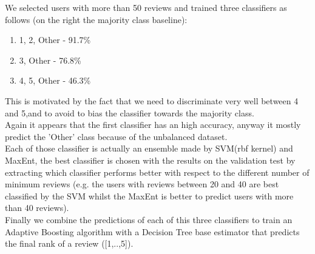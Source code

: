 \documentclass[11pt]{article}
\begin{document}
We selected users with more than 50 reviews and trained three classifiers as follows (on the right the majority class baseline):
\begin{enumerate}
	\item 1, 2, Other - 91.7\%
	\item 3, Other - 76.8\%
	\item 4, 5, Other - 46.3\%
\end{enumerate}
This is motivated by the fact that we need to discriminate very well between 4 and 5,and to avoid to bias the classifier towards the majority class.\\
Again it appears that the first classifier has an high accuracy, anyway it mostly predict the 'Other' class because of the unbalanced dataset.\\
Each of those classifier is actually an ensemble made by SVM(rbf kernel) and MaxEnt, the best classifier is chosen with the results on the validation test by extracting which classifier performs better with respect to the different number of minimum reviews (e.g. the users with reviews between 20 and 40 are best classified by the SVM whilst the MaxEnt is better to predict users with more than 40 reviews).\\
Finally we combine the predictions of each of this three classifiers to train an Adaptive Boosting algorithm with a Decision Tree base estimator that predicts the final rank of a review ([1,..,5]).\\
\end{document}
